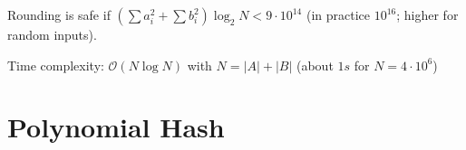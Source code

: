 \documentclass{article}
\begin{document}
Rounding is safe if $(\sum a_i^2 + \sum b_i^2)\log_2{N} < 9\cdot10^{14}$
(in practice $10^{16}$; higher for random inputs).

Time complexity: $\mathcal{O}(N \log N)$ with $N = |A|+|B|$ (about $1s$ for $N=4 \cdot 10^6$)


\section*{Polynomial Hash}

\end{document}
